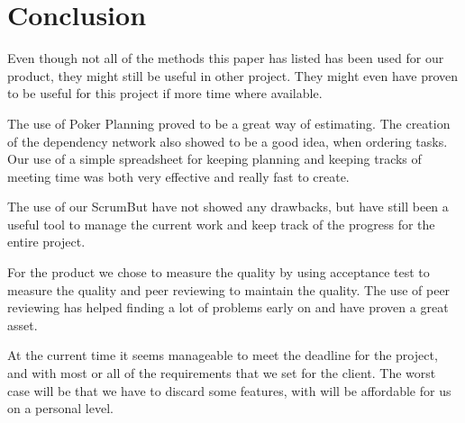 \section{Conclusion}
Even though not all of the methods this paper has listed has been used for our product, they might still be useful in other project. They might even have proven to be useful for this project if more time where available.

The use of Poker Planning proved to be a great way of estimating. The creation of the dependency network also showed to be a good idea, when ordering tasks.
Our use of a simple spreadsheet for keeping planning and keeping tracks of meeting time was both very effective and really fast to create.

The use of our ScrumBut have not showed any drawbacks, but have still been a useful tool to manage the current work and keep track of the progress for the entire project.

For the product we chose to measure the quality by using acceptance test to measure the quality and peer reviewing to maintain the quality.
The use of peer reviewing has helped finding a lot of problems early on and have proven a great asset.

At the current time it seems manageable to meet the deadline for the project, and with most or all of the requirements that we set for the client. The worst case will be that we have to discard some features, with will be affordable for us on a personal level. 
